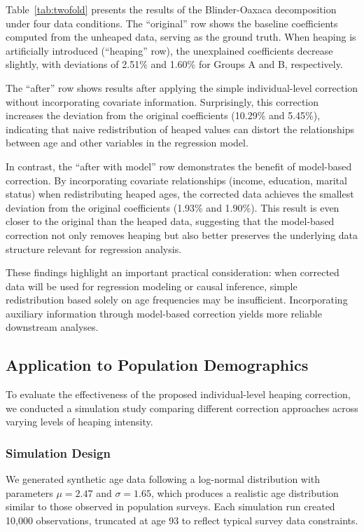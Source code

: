 \documentclass[12pt]{article}
\theoremstyle{plain}
\theoremstyle{definition}
\begin{document}
Table~\ref{tab:twofold} presents the results of the Blinder-Oaxaca decomposition under four data conditions. The ``original'' row shows the baseline coefficients computed from the unheaped data, serving as the ground truth. When heaping is artificially introduced (``heaping'' row), the unexplained coefficients decrease slightly, with deviations of 2.51\% and 1.60\% for Groups A and B, respectively.

The ``after'' row shows results after applying the simple individual-level correction without incorporating covariate information. Surprisingly, this correction increases the deviation from the original coefficients (10.29\% and 5.45\%), indicating that naive redistribution of heaped values can distort the relationships between age and other variables in the regression model.

In contrast, the ``after with model'' row demonstrates the benefit of model-based correction. By incorporating covariate relationships (income, education, marital status) when redistributing heaped ages, the corrected data achieves the smallest deviation from the original coefficients (1.93\% and 1.90\%). This result is even closer to the original than the heaped data, suggesting that the model-based correction not only removes heaping but also better preserves the underlying data structure relevant for regression analysis.

These findings highlight an important practical consideration: when corrected data will be used for regression modeling or causal inference, simple redistribution based solely on age frequencies may be insufficient. Incorporating auxiliary information through model-based correction yields more reliable downstream analyses.

\subsection{Application to Population Demographics}

To evaluate the effectiveness of the proposed individual-level heaping correction, we conducted a simulation study comparing different correction approaches across varying levels of heaping intensity.

\subsubsection{Simulation Design}

We generated synthetic age data following a log-normal distribution with parameters $\mu = 2.47$ and $\sigma = 1.65$, which produces a realistic age distribution similar to those observed in population surveys. Each simulation run created 10,000 observations, truncated at age 93 to reflect typical survey data constraints.
\end{document}
